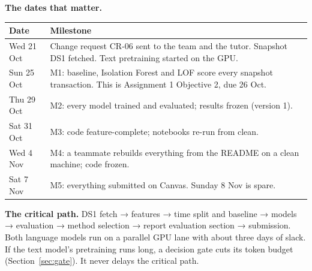 \textbf{The dates that matter.}
\begin{center}
\small
\begin{tabularx}{\textwidth}{@{}L{3.1cm}Y@{}}
\toprule
\textbf{Date} & \textbf{Milestone} \\
\midrule
Wed 21 Oct & Change request CR-06 sent to the team and the tutor. Snapshot DS1 fetched. Text pretraining started on the GPU. \\
Sun 25 Oct & M1: baseline, Isolation Forest and LOF score every snapshot transaction. This is Assignment 1 Objective 2, due 26 Oct. \\
Thu 29 Oct & M2: every model trained and evaluated; results frozen (version 1). \\
Sat 31 Oct & M3: code feature-complete; notebooks re-run from clean. \\
Wed 4 Nov & M4: a teammate rebuilds everything from the README on a clean machine; code frozen. \\
Sat 7 Nov & M5: everything submitted on Canvas. Sunday 8 Nov is spare. \\
\bottomrule
\end{tabularx}
\end{center}

\textbf{The critical path.} DS1 fetch → features → time split and baseline → models → evaluation
→ method selection → report evaluation section → submission. Both language models run on a
parallel GPU lane with about three days of slack. If the text model's pretraining runs long, a
decision gate cuts its token budget (Section~\ref{sec:gate}). It never delays the critical path.
